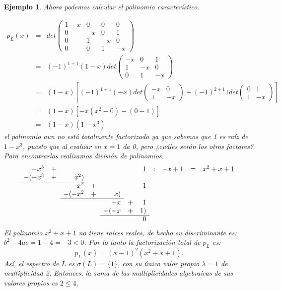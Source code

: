 \documentclass[12pt]{book}
\newtheorem{ejem}{Ejemplo}
\begin{document}
\begin{ejem}
{Ahora podemos calcular el polinomio característico.

\begin{eqnarray*}
p_L(x)&=&det\left(\begin{array}{cccc} 1-x&0&0&0\\0&-x&0&1\\0&1&-x&0\\0&0&1&-x\end{array}\right)\\
&=&(-1)^{1+1}(1-x) det\left(\begin{array}{ccc} -x&0&1\\1&-x&0\\0&1&-x\end{array}\right)\\
&=&(1-x)\left[(-1)^{1+1}(-x) det\left(\begin{array}{ccc} -x&0\\1&-x\end{array}\right)+(-1)^{2+1}1det\left(\begin{array}{ccc} 0&1\\1&-x\end{array}\right)\right]\\
&=&(1-x)[-x(x^2-0)-(0-1)]\\
&=&(1-x)(1-x^3)\
\end{eqnarray*}
el polinomio aun no está totalmente factorizado ya que sabemos que 1 es raíz de $1-x^3$, puesto que al evaluar en $x=1$ da 0, pero ¿cuáles serán los otros factores? Para encontrarlos realizamos división de polinomios.
$$
\begin{array}{rrrrrrrrrrr}
-x^3&+&&&&&1&:&-x+1&=&x^2+x+1\\
-(-x^3&+&x^2)&&&&&\\\cline{1-3}
&&-x^2&+&&&1\\
&&-(-x^2&+&x)&&\\\cline{3-5}
&&&&-x&+&1\\
&&&&-(-x&+&1)\\\cline{5-7}
&&&&&&0
\end{array}
$$
El polinomio $x^2+x+1$ no tiene raíces reales, de hecho su discriminante es: $b^2-4ac=1-4=-3<0$.
Por lo tanto la factorización total de $p_L$ es:
$$p_L(x)=(x-1)^2(x^2+x+1).$$
Así, el espectro de $L$ es $\sigma(L)=\{1\}$, con su único valor propio $\lambda=1$ de multiplicidad 2.
Entonces, la suma de las multiplicidades algebraicas de sus valores propios es $2\le4$.
}
\end{ejem}
\end{document}
